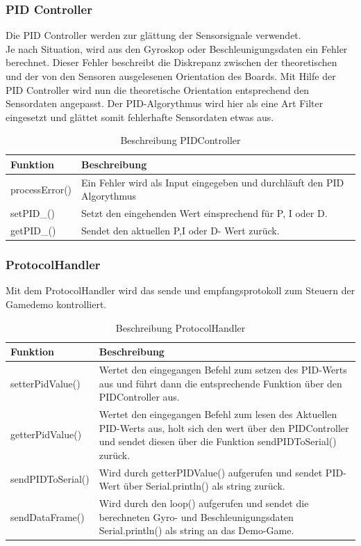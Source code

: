 \subsubsection{PID Controller}
Die PID Controller werden zur glättung der Sensorsignale verwendet.\\
Je nach Situation, wird aus den Gyroskop oder Beschleunigungsdaten ein Fehler berechnet. 
Dieser Fehler beschreibt die Diskrepanz zwischen der theoretischen und der von den Sensoren ausgelesenen Orientation des Boards.
Mit Hilfe der PID Controller wird nun die theoretische Orientation entsprechend den Sensordaten angepasst.
Der PID-Algorythmus wird hier als eine Art Filter eingesetzt und glättet somit fehlerhafte Sensordaten etwas aus.\
\begin{table}[H]
  \centering
  \settowidth{}
  \setlength\extrarowheight{2pt}
  \begin{tabulary}{1.0\textwidth}{|L|L|}
    \hline
    \textbf{Funktion} &
    \textbf{Beschreibung}\\
    \hline
    processError() & Ein Fehler wird als Input eingegeben und durchläuft den PID Algorythmus\\
    \hline
    setPID\_() & Setzt den eingehenden Wert einsprechend für P, I oder D. \\
    \hline
    getPID\_() & Sendet den aktuellen P,I oder D- Wert zurück.\\
    \hline
  \end{tabulary}
  \caption{Beschreibung PIDController}
\end{table}


\subsubsection{ProtocolHandler}
Mit dem ProtocolHandler wird das sende und empfangsprotokoll zum Steuern der Gamedemo kontrolliert.
\begin{table}[H]
  \centering
  \settowidth{}
  \setlength\extrarowheight{2pt}
  \begin{tabulary}{1.0\textwidth}{|L|L|}
    \hline
    \textbf{Funktion} &
    \textbf{Beschreibung}\\
    \hline
    setterPidValue() &
    Wertet den eingegangen Befehl zum setzen des PID-Werts aus und führt dann die entsprechende Funktion über den PIDController aus. \\
    \hline
    getterPidValue() &
    Wertet den eingegangen Befehl zum lesen des Aktuellen PID-Werts aus, holt sich den wert über den PIDController und sendet diesen über die Funktion sendPIDToSerial() zurück.\\
    \hline
    sendPIDToSerial() & 
    Wird durch getterPIDValue() aufgerufen und sendet PID-Wert über Serial.println() als string zurück.\\
    \hline
    sendDataFrame() &
    Wird durch den loop() aufgerufen und sendet die berechneten Gyro- und Beschleunigungsdaten Serial.println() als string an das Demo-Game.\\
    \hline
  \end{tabulary}
  \caption{Beschreibung ProtocolHandler}
\end{table}

\newpage